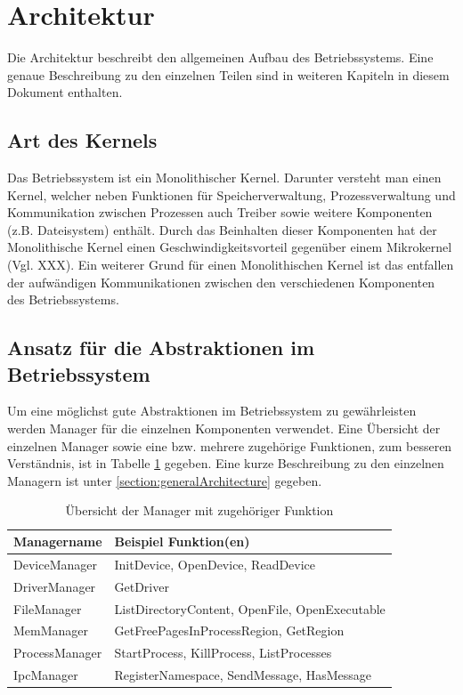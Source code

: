 \section{Architektur}
Die Architektur beschreibt den allgemeinen Aufbau des Betriebssystems. Eine genaue Beschreibung zu den einzelnen Teilen sind in weiteren Kapiteln in diesem Dokument enthalten.

\subsection{Art des Kernels}
Das Betriebssystem ist ein Monolithischer Kernel. Darunter versteht man einen Kernel, welcher neben Funktionen für Speicherverwaltung, Prozessverwaltung und Kommunikation zwischen Prozessen auch Treiber sowie weitere Komponenten (z.B. Dateisystem) enthält. Durch das Beinhalten dieser Komponenten hat der Monolithische Kernel einen Geschwindigkeitsvorteil gegenüber einem Mikrokernel (Vgl. XXX).
Ein weiterer Grund für einen Monolithischen Kernel ist das entfallen der aufwändigen Kommunikationen zwischen den verschiedenen Komponenten des Betriebssystems.

\subsection{Ansatz für die Abstraktionen im Betriebssystem}
Um eine möglichst gute Abstraktionen im Betriebssystem zu gewährleisten werden Manager für die einzelnen Komponenten verwendet. Eine Übersicht der einzelnen Manager sowie eine bzw. mehrere zugehörige Funktionen, zum besseren Verständnis, ist in Tabelle \ref{table:Manager-function} gegeben. Eine kurze Beschreibung zu den einzelnen Managern ist unter \ref{section:generalArchitecture} gegeben.

\begin{table}[H]
\begin{tabular}{p{4cm} | p{9cm}}
  \textbf{Managername} & \textbf{Beispiel Funktion(en)} \\ 
  \hline
  DeviceManager & InitDevice, OpenDevice, ReadDevice \\
  DriverManager & GetDriver \\
  FileManager & ListDirectoryContent, OpenFile, OpenExecutable \\
  MemManager & GetFreePagesInProcessRegion, GetRegion \\
  ProcessManager & StartProcess, KillProcess, ListProcesses \\
  IpcManager & RegisterNamespace, SendMessage, HasMessage \\
 \end{tabular}
 \caption{Übersicht der Manager mit zugehöriger Funktion}
 \label{table:Manager-function}
\end{table}


